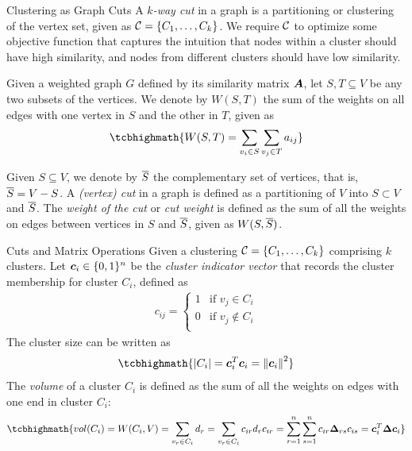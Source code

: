 \begin{frame}{Clustering as Graph Cuts}
A {\em $k$-way cut} in a graph is a partitioning or clustering of
the vertex set, given as ${\mathcal C} = \{C_1, \ldots, C_k\}$.
We require ${\mathcal C}$ to optimize
some objective function that captures the intuition that nodes
within a cluster should have high similarity, and nodes from
different clusters should have low similarity.

\medskip
Given a weighted graph $G$ def\/{i}ned by its similarity matrix ${\boldsymbol A}$,
let $S, T \subseteq V$ be any two
subsets of the vertices. We denote by $W(S,T)$ the sum of the
weights on all edges with one vertex in $S$ and the other in $T$,
given as
\begin{align*}
\tcbhighmath{
    W(S, T) = \sum_{v_i \in S} \sum_{v_{j} \in T} a_{ij}
}
\end{align*}

\medskip
Given $S \subseteq V$, we denote by $\overline{S}$ the complementary set
of vertices, that is, $\overline{S} = V - S$. A {\em (vertex) cut} in a
graph is def\/{i}ned as a partitioning of $V$ into $S \subset V$ and
$\overline{S}$. The {\em weight of the cut} or {\em cut weight} is
def\/{i}ned as the sum of all the weights on
edges between vertices in $S$
and $\overline{S}$, given as $W(S, \overline{S})$.
\end{frame}


\begin{frame}{Cuts and Matrix Operations}
  \small
Given a clustering ${\mathcal C} = \{C_1,\dots,C_k\}$ comprising $k$ clusters.
Let ${\boldsymbol c}_i \in \{0,1\}^n$ be the {\em cluster indicator vector}
that records the cluster membership for cluster $C_i$, def\/{i}ned as
\begin{align*}
    c_{ij} =
        \begin{cases}
            1 & \text{if $v_{j} \in C_i$}\\
            0 & \text{if $v_{j} \not\in C_i$}\\
        \end{cases}
\end{align*}
The cluster size can be written as
\begin{align*}
\tcbhighmath{
    \card{C_i} = \bc_i^T\bc_i = \norm{\bc_i}^2
}
\end{align*}
The {\em volume} of a cluster
$C_i$ is def\/{i}ned as the sum of all the weights on edges with one
end in cluster $C_i$:
\begin{align*}
\tcbhighmath{
    vol(C_i) = W(C_i, V)  = \sum_{v_r \in C_i} d_r
    = \sum_{v_r \in C_i} c_{ir} d_r c_{ir}
     = \sum_{r=1}^n \sum_{s=1}^n c_{ir} \bDelta_{rs} c_{is}
     = \bc_i^T \bDelta \bc_i
}
\end{align*}
\end{frame}

